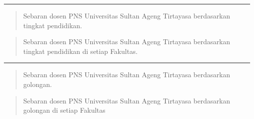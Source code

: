 \documentclass[
]{book}
\begin{document}
\begin{center}\rule{0.5\linewidth}{0.5pt}\end{center}

\begin{quote}
Sebaran dosen PNS Universitas Sultan Ageng Tirtayasa berdasarkan tingkat pendidikan.
\end{quote}

\hypertarget{htmlwidget-6e03891aa6a5101ef117}{}

\begin{quote}
Sebaran dosen PNS Universitas Sultan Ageng Tirtayasa berdasarkan tingkat pendidikan di setiap Fakultas.
\end{quote}

\begin{table}[H]
\centering
{}
\end{table}

\begin{center}\rule{0.5\linewidth}{0.5pt}\end{center}

\begin{quote}
Sebaran dosen PNS Universitas Sultan Ageng Tirtayasa berdasarkan golongan.
\end{quote}

\hypertarget{htmlwidget-2f04a1e8136db22fc345}{}

\begin{quote}
Sebaran dosen PNS Universitas Sultan Ageng Tirtayasa berdasarkan golongan di setiap Fakultas
\end{quote}
\end{document}
